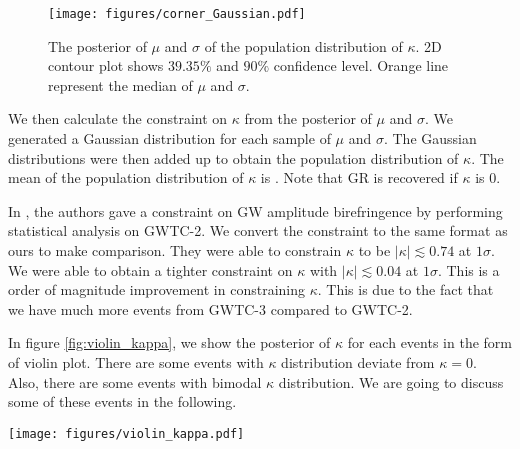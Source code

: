 \documentclass[aps,prd,twocolumn,superscriptaddress,preprintnumbers,floatfix,nofootinbib]{revtex4-2}
\begin{document}
\begin{figure}[h]
    \texttt{[image: figures/corner\_Gaussian.pdf]}
    \caption{
        The posterior of $\mu$ and $\sigma$ of the population distribution of $\kappa$.
        2D contour plot shows $39.35\%$ and $90\%$ confidence level.
        Orange line represent the median of $\mu$ and $\sigma$.
    }
    \label{fig:corner_Gaussian}
\end{figure}

We then calculate the constraint on $\kappa$ from the posterior of $\mu$ and $\sigma$.
We generated a Gaussian distribution for each sample of $\mu$ and $\sigma$.
The Gaussian distributions were then added up to obtain the population distribution of $\kappa$.
The mean of the population distribution of $\kappa$ is .
Note that GR is recovered if $\kappa$ is $0$.

In \citet{Okounkova_2022}, the authors gave a constraint on GW amplitude birefringence by performing statistical analysis on GWTC-2.
We convert the constraint to the same format as ours to make comparison.
They were able to constrain $\kappa$ to be $|\kappa| \lesssim 0.74$ at $1 \sigma$.
We were able to obtain a tighter constraint on $\kappa$ with $|\kappa| \lesssim 0.04$ at $1 \sigma$.
This is a order of magnitude improvement in constraining $\kappa$.
This is due to the fact that we have much more events from GWTC-3 compared to GWTC-2.

In figure \ref{fig:violin_kappa}, we show the posterior of $\kappa$ for each events in the form of violin plot.
There are some events with $\kappa$ distribution deviate from $\kappa=0$.
Also, there are some events with bimodal $\kappa$ distribution.
We are going to discuss some of these events in the following.

\begin{figure*}[ht]
    \texttt{[image: figures/violin\_kappa.pdf]}
    \caption{
        The violin plot shows the posterior of $\kappa$ for all 69 events included in this study.
        Each violin represents a different event.
        The violins are sorted by the quotient of median and standard deviation of the posterior.
        Blue horizontal line represent the median value of $\mu$, and blue region represent 1 $\sigma$ confidence level.
        Orange horizontal line represent $\kappa=0$.
        This plot shows that there are some events with $\kappa$ distribution significantly deviate from $0$.
    }
    \label{fig:violin_kappa}
\end{figure*}
\end{document}
